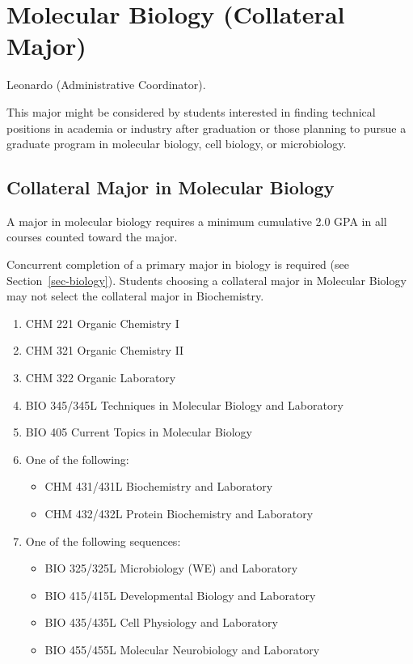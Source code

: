 \documentclass[
  letterpaper,
]{scrbook}
\providecommand{\tightlist}{%
  \setlength{\itemsep}{0pt}\setlength{\parskip}{0pt}}
\begin{document}
\section{Molecular Biology (Collateral
Major)}\label{sec-molecular-biology}

Leonardo (Administrative Coordinator).

This major might be considered by students interested in finding
technical positions in academia or industry after graduation or those
planning to pursue a graduate program in molecular biology, cell
biology, or microbiology.

\subsection{Collateral Major in Molecular
Biology}\label{collateral-major-in-molecular-biology}

A major in molecular biology requires a minimum cumulative 2.0 GPA in
all courses counted toward the major.

Concurrent completion of a primary major in biology is required (see
Section~\ref{sec-biology}). Students choosing a collateral major in
Molecular Biology may not select the collateral major in Biochemistry.

\begin{enumerate}
\def\labelenumi{\arabic{enumi}.}
\tightlist
\item
  CHM 221 Organic Chemistry I
\item
  CHM 321 Organic Chemistry II
\item
  CHM 322 Organic Laboratory
\item
  BIO 345/345L Techniques in Molecular Biology and Laboratory
\item
  BIO 405 Current Topics in Molecular Biology
\item
  One of the following:

  \begin{itemize}
  \tightlist
  \item
    CHM 431/431L Biochemistry and Laboratory
  \item
    CHM 432/432L Protein Biochemistry and Laboratory
  \end{itemize}
\item
  One of the following sequences:

  \begin{itemize}
  \tightlist
  \item
    BIO 325/325L Microbiology (WE) and Laboratory
  \item
    BIO 415/415L Developmental Biology and Laboratory
  \item
    BIO 435/435L Cell Physiology and Laboratory
  \item
    BIO 455/455L Molecular Neurobiology and Laboratory
  \end{itemize}
\end{enumerate}
\end{document}

